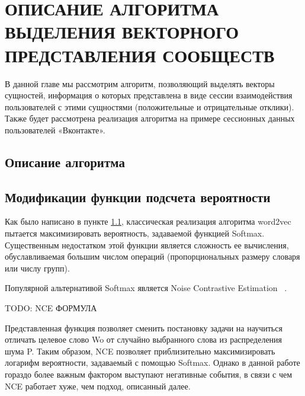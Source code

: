 \documentclass[times,specification,annotation]{itmo-student-thesis}
\begin{document}


\finishrelatedwork

\chapter{ОПИСАНИЕ АЛГОРИТМА ВЫДЕЛЕНИЯ ВЕКТОРНОГО ПРЕДСТАВЛЕНИЯ СООБЩЕСТВ}

В данной главе мы рассмотрим алгоритм, позволяющий выделять векторы
сущностей, информация о которых представлена в виде сессии взаимодействия
пользователей с этими сущностями (положительные и отрицательные отклики).
Также будет рассмотрена реализация алгоритма на примере сессионных данных
пользователей «Вконтакте».


\section{Описание алгоритма}\label{sec:algo}

\section{Модификации функции подсчета вероятности }
Как было написано в пункте \ref{sec:algo}, классическая реализация
алгоритма word2vec пытается максимизировать вероятность, задаваемой функцией
Softmax. Существенным недостатком этой функции является сложность ее
вычисления, обуславливаемая большим числом операций (пропорциональных
размеру словаря или числу групп).



Популярной альтернативой Softmax является Noise Contrastive Estimation ~\cite{mikolov2013distributed}.

TODO: NCE ФОРМУЛА

Представленная функция позволяет сменить постановку задачи на научиться
отличать целевое слово Wo от случайно выбранного слова из распределения шума
P. Таким образом, NCE позволяет приблизительно максимизировать логарифм
вероятности, задаваемый с помощью Softmax. Однако в данной работе гораздо
более важным фактором выступают негативные события, в связи с чем NCE
работает хуже, чем подход, описанный далее.
\end{document}
